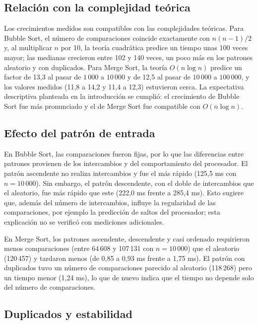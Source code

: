 \documentclass[12pt,a4paper,twocolumn]{article}
\begin{document}
\subsection{Relación con la complejidad teórica}
 
Los crecimientos medidos son compatibles con las complejidades
teóricas. Para Bubble Sort, el número de comparaciones coincide
exactamente con $n(n-1)/2$ y, al multiplicar $n$ por 10, la teoría
cuadrática predice un tiempo unas 100 veces mayor; las medianas
crecieron entre 102 y 140 veces, un poco más en los patrones aleatorio
y con duplicados. Para Merge Sort, la teoría $O(n\log n)$ predice un
factor de 13,3 al pasar de $1\,000$ a $10\,000$ y de 12,5 al pasar de
$10\,000$ a $100\,000$, y los valores medidos (11,8 a 14,2 y 11,4 a
12,3) estuvieron cerca. La expectativa descriptiva planteada en la
introducción se cumplió: el crecimiento de Bubble Sort fue más
pronunciado y el de Merge Sort fue compatible con $O(n\log n)$.
 
\subsection{Efecto del patrón de entrada}
 
En Bubble Sort, las comparaciones fueron fijas, por lo que las diferencias
entre patrones provienen de los intercambios y del comportamiento del
procesador. El patrón ascendente no realiza intercambios y fue el más
rápido (125,5 ms con $n = 10\,000$). Sin embargo, el patrón descendente,
con el doble de intercambios que el aleatorio, fue más rápido que este
(222,0 ms frente a 285,4 ms). Esto sugiere que, además del número de
intercambios, influye la regularidad de las comparaciones, por ejemplo
la predicción de saltos del procesador; esta explicación no se verificó
con mediciones adicionales.
 
En Merge Sort, los patrones ascendente, descendente y casi ordenado
requirieron menos comparaciones (entre 64\,608 y 107\,131 con
$n = 10\,000$) que el aleatorio (120\,457) y tardaron menos (de 0,85 a
0,93 ms frente a 1,75 ms). El patrón con duplicados tuvo un número
de comparaciones parecido al aleatorio (118\,268) pero un tiempo menor
(1,24 ms), lo que de nuevo indica que el tiempo no depende solo del
número de comparaciones.
 
\subsection{Duplicados y estabilidad}
 
\end{document}
